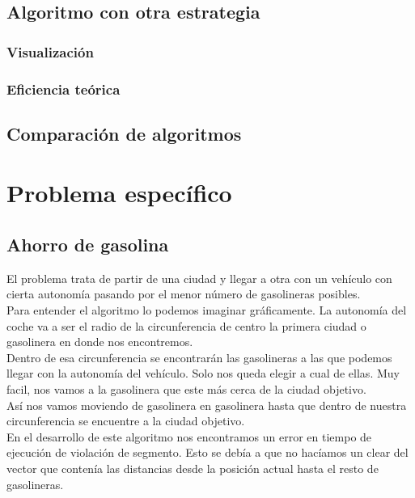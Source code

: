 \documentclass[11pt,a4paper]{article} %
\begin{document}
\newpage
\subsection{Algoritmo con otra estrategia}

\subsubsection{Visualización}

\subsubsection{Eficiencia teórica}


\newpage
\subsection{Comparación de algoritmos}


\newpage
\section{Problema específico}
\subsection{Ahorro de gasolina}
El problema trata de partir de una ciudad y llegar a otra con un vehículo con cierta autonomía pasando por el menor número de gasolineras posibles.\\

Para entender el algoritmo lo podemos imaginar gráficamente. La autonomía del coche va a ser el radio de la circunferencia de centro la primera ciudad o gasolinera en donde nos encontremos.\\

Dentro de esa circunferencia se encontrarán las gasolineras a las que podemos llegar con la autonomía del vehículo. Solo nos queda elegir a cual de ellas. Muy facil, nos vamos a la gasolinera que este más cerca de la ciudad objetivo. \\

Así nos vamos moviendo de gasolinera en gasolinera hasta que dentro de nuestra circunferencia se encuentre a la ciudad objetivo.\\

En el desarrollo de este algoritmo nos encontramos un error en tiempo de ejecución de violación de segmento. Esto se debía a que no hacíamos un clear del vector que contenía las distancias desde la posición actual hasta el resto de gasolineras.\\
\end{document}
